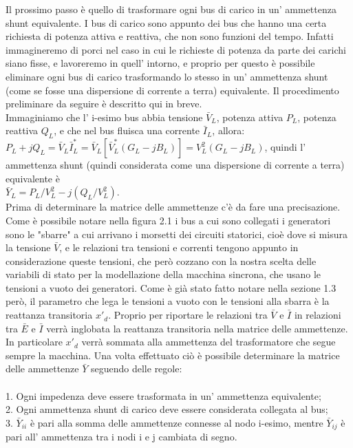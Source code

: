 \documentclass[Lau,noexaminfo]{sapthesis}
\begin{document}
	Il prossimo passo è quello di trasformare ogni bus di carico in un' ammettenza shunt equivalente. I bus di carico sono appunto dei bus che hanno una certa richiesta di potenza attiva e reattiva, che non sono funzioni del tempo. Infatti immagineremo di porci nel caso in cui le richieste di potenza da parte dei carichi siano fisse, e lavoreremo in quell' intorno, e proprio per questo è possibile eliminare ogni bus di carico trasformando lo stesso in un' ammettenza shunt (come se fosse una dispersione di corrente a terra) equivalente. Il procedimento preliminare da seguire è descritto qui in breve.\\
	Immaginiamo che l' i-esimo bus abbia tensione $\bar{V}_L$, potenza attiva $P_L$, potenza reattiva $Q_L$, e che nel bus fluisca una corrente $\bar{I}_L$, allora:\\
	$P_L+jQ_L=\bar{V}_L\bar{I}^*_L=\bar{V}_L[\bar{V}^*_L(G_L-jB_L)]=V_L^2(G_L-jB_L)$, quindi l' ammettenza shunt (quindi considerata come una dispersione di corrente a terra) equivalente è\\
	$\bar{Y}_L=P_L/V^2_L-j(Q_L/V^2_L)$.\\
	Prima di determinare la matrice delle ammettenze c'è da fare una precisazione. Come è possibile notare nella figura 2.1 i bus a cui sono collegati i generatori sono le "sbarre" a cui arrivano i morsetti dei circuiti statorici, cioè dove si misura la tensione $\bar{V}$, e le relazioni tra tensioni e correnti tengono appunto in considerazione queste tensioni, che però cozzano con la nostra scelta delle variabili di stato per la modellazione della macchina sincrona, che usano le tensioni a vuoto dei generatori. Come è già stato fatto notare nella sezione 1.3 però, il parametro che lega le tensioni a vuoto con le tensioni alla sbarra è la reattanza transitoria $x'_d$. Proprio per riportare le relazioni tra $\bar{V}$ e $\bar{I}$ in relazioni tra $\bar{E}$ e $\bar{I}$ verrà inglobata la reattanza transitoria nella matrice delle ammettenze. In particolare $x'_d$ verrà sommata alla ammettenza del trasformatore che segue sempre la macchina.
	Una volta effettuato ciò è possibile determinare la matrice delle ammettenze $\bar{Y}$ seguendo delle regole:\\\\
	1. Ogni impedenza deve essere trasformata in un' ammettenza equivalente;\\
	2. Ogni ammettenza shunt di carico deve essere considerata collegata al bus;\\
	3. $\bar{Y}_{ii}$ è pari alla somma delle ammettenze connesse al nodo i-esimo, mentre $\bar{Y}_{ij}$ è pari all' ammettenza tra i nodi i e j cambiata di segno.\\\\
\end{document}

